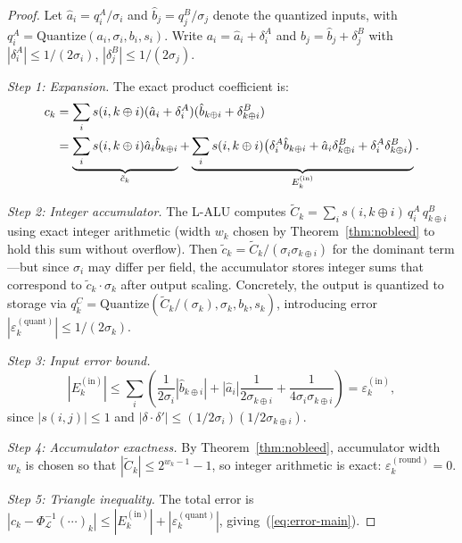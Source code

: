 \documentclass[11pt,a4paper]{article}
\theoremstyle{definition}
\theoremstyle{plain}
\theoremstyle{remark}
\newcommand{\Quantize}{\mathrm{Quantize}}
\newcommand{\Unpack}{\Phi^{-1}_{\mathcal{L}}}
\begin{document}
\begin{proof}
Let $\hat{a}_i = q_i^A/\sigma_i$ and $\hat{b}_j = q_j^B/\sigma_j$ denote the quantized inputs, with $q_i^A = \Quantize(a_i,\sigma_i,b_i,s_i)$.  Write $a_i = \hat{a}_i + \delta_i^A$ and $b_j = \hat{b}_j + \delta_j^B$ with $|\delta_i^A|\le 1/(2\sigma_i)$, $|\delta_j^B|\le 1/(2\sigma_j)$.

\textit{Step 1: Expansion.}  The exact product coefficient is:
\begin{align}
  c_k &= \sum_i s(i,k\oplus i)(\hat{a}_i + \delta_i^A)(\hat{b}_{k\oplus i} + \delta_{k\oplus i}^B) \notag\\
  &= \underbrace{\sum_i s(i,k\oplus i)\hat{a}_i\hat{b}_{k\oplus i}}_{\tilde{c}_k} + \underbrace{\sum_i s(i,k\oplus i)\bigl(\delta_i^A \hat{b}_{k\oplus i} + \hat{a}_i \delta_{k\oplus i}^B + \delta_i^A\delta_{k\oplus i}^B\bigr)}_{E_k^{(\mathrm{in})}}.
\end{align}

\textit{Step 2: Integer accumulator.}  The L-ALU computes $\tilde{C}_k = \sum_i s(i,k\oplus i)\, q_i^A\, q_{k\oplus i}^B$ using exact integer arithmetic (width $w_k$ chosen by Theorem~\ref{thm:nobleed} to hold this sum without overflow).  Then $\tilde{c}_k = \tilde{C}_k / (\sigma_i \sigma_{k\oplus i})$ for the dominant term---but since $\sigma_i$ may differ per field, the accumulator stores integer sums that correspond to $\tilde{c}_k \cdot \sigma_k$ after output scaling.  Concretely, the output is quantized to storage via $q_k^C = \Quantize(\tilde{C}_k/(\sigma_k), \sigma_k, b_k, s_k)$, introducing error $|\varepsilon_k^{(\mathrm{quant})}| \le 1/(2\sigma_k)$.

\textit{Step 3: Input error bound.}  
\[
|E_k^{(\mathrm{in})}| \le \sum_i \left(\frac{1}{2\sigma_i}|\hat{b}_{k\oplus i}| + |\hat{a}_i|\frac{1}{2\sigma_{k\oplus i}} + \frac{1}{4\sigma_i\sigma_{k\oplus i}}\right) = \varepsilon_k^{(\mathrm{in})},
\]
since $|s(i,j)|\le 1$ and $|\delta\cdot\delta'|\le (1/2\sigma_i)(1/2\sigma_{k\oplus i})$.

\textit{Step 4: Accumulator exactness.}  By Theorem~\ref{thm:nobleed}, accumulator width $w_k$ is chosen so that $|\tilde{C}_k|\le 2^{w_k-1}-1$, so integer arithmetic is exact: $\varepsilon_k^{(\mathrm{round})} = 0$.

\textit{Step 5: Triangle inequality.}  The total error is $|c_k - \Unpack(\cdots)_k| \le |E_k^{(\mathrm{in})}| + |\varepsilon_k^{(\mathrm{quant})}|$, giving~(\ref{eq:error-main}).
\end{proof}
\end{document}
